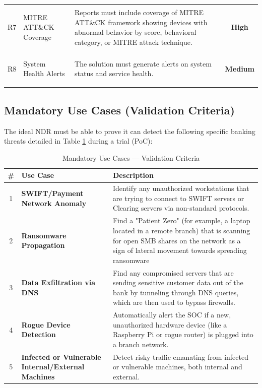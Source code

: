 \documentclass[12pt,a4paper]{report}
\newcommand{\high}{\textbf{High}}
\newcommand{\medium}{\textbf{Medium}}
\begin{document}
\begin{xltabular}{\textwidth}{c >{\bfseries\raggedright\arraybackslash}p{3.2cm} >{\raggedright\arraybackslash}X c}
    R7 & MITRE ATT\&CK Coverage &
    Reports must include coverage of MITRE ATT\&CK framework showing devices with abnormal behavior by score, behavioral category, or MITRE attack technique. & \high \\
    
    R8 & System Health Alerts &
    The solution must generate alerts on system status and service health. & \medium \\
    
\end{xltabular}

\subsection{Mandatory Use Cases (Validation Criteria)}

The ideal NDR must be able to prove it can detect the following specific banking threats detailed in Table \ref{tab:usecases} during a trial (PoC):

\begin{table}[H]
  \centering
  \captionsetup{singlelinecheck=false, justification=raggedright}
  \caption{Mandatory Use Cases --- Validation Criteria}
  \label{tab:usecases}
  \renewcommand{\arraystretch}{1.5}
  \begin{tabularx}{\textwidth}{c >{\bfseries}p{4cm} X}
    \toprule
    \textbf{\#} & \textbf{Use Case} & \textbf{Description} \\
    \midrule
    1 & SWIFT/Payment Network Anomaly &
      Identify any unauthorized workstations that are trying to connect to SWIFT servers or Clearing servers via non-standard protocols. \\
    2 & Ransomware Propagation &
      Find a "Patient Zero" (for example, a laptop located in a remote branch) that is scanning for open SMB shares on the network as a sign of lateral movement towards spreading ransomware \\
    3 & Data Exfiltration via DNS &
      Find any compromised servers that are sending sensitive customer data out of the bank by tunneling through DNS queries, which are then used to bypass firewalls. \\
    4 & Rogue Device Detection &
      Automatically alert the SOC if a new, unauthorized hardware device (like a Raspberry
      Pi or rogue router) is plugged into a branch network. \\
    5 & Infected or Vulnerable Internal/External Machines &
      Detect risky traffic emanating from infected or vulnerable machines, both internal and
      external. \\
    \bottomrule
  \end{tabularx}
\end{table}
\end{document}
